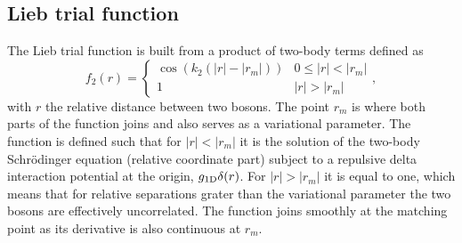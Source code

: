 \subsection{Lieb trial function}

The Lieb trial function is built from a product of two-body terms defined as
%
\begin{equation}
  \label{eq:vmc-lieb-two-body-function}
  f_2(r) = \begin{cases}
    \cos(k_2(|r| - |r_m|)) & 0 \leq |r| < |r_m| \\ 1 & |r| > |r_m|
  \end{cases},
\end{equation}
%
with $r$ the relative distance between two bosons. The point $r_m$ is where both
parts of the function joins and also serves as a variational parameter. The
function is defined such that for $|r| < |r_m|$ it is the solution of the
two-body Schrödinger equation (relative coordinate part) subject to a repulsive
delta interaction potential at the origin, $g_{ \mathrm{1D} } \delta(r)$. For $|r| >
  |r_m|$ it is equal to one, which means that for relative separations grater than
the variational parameter the two bosons are effectively uncorrelated. The
function joins smoothly at the matching point as its derivative is also
continuous at $r_m$.

